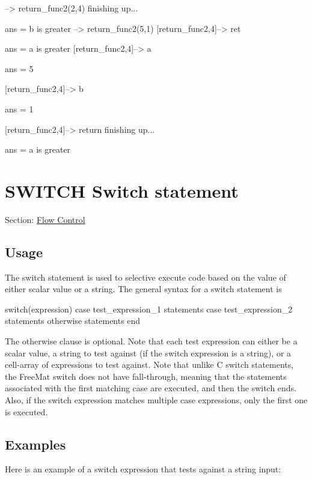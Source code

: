 \begin{DoxyVerbInclude}
--> return_func2(2,4)
finishing up...

ans = 
b is greater
--> return_func2(5,1)
[return_func2,4]--> ret

ans = 
a is greater
[return_func2,4]--> a

ans = 
 5 

[return_func2,4]--> b

ans = 
 1 

[return_func2,4]--> return
finishing up...

ans = 
a is greater
\end{DoxyVerbInclude}
 \hypertarget{flow_switch}{}\section{S\-W\-I\-T\-C\-H Switch statement}\label{flow_switch}
Section\-: \hyperlink{sec_flow}{Flow Control} \hypertarget{vtkwidgets_vtkxyplotwidget_Usage}{}\subsection{Usage}\label{vtkwidgets_vtkxyplotwidget_Usage}
The {\ttfamily switch} statement is used to selective execute code based on the value of either scalar value or a string. The general syntax for a {\ttfamily switch} statement is \begin{DoxyVerb}  switch(expression)
    case test_expression_1
      statements
    case test_expression_2
      statements
    otherwise
      statements
  end
\end{DoxyVerb}
 The {\ttfamily otherwise} clause is optional. Note that each test expression can either be a scalar value, a string to test against (if the switch expression is a string), or a {\ttfamily cell-\/array} of expressions to test against. Note that unlike {\ttfamily C} {\ttfamily switch} statements, the Free\-Mat {\ttfamily switch} does not have fall-\/through, meaning that the statements associated with the first matching case are executed, and then the {\ttfamily switch} ends. Also, if the {\ttfamily switch} expression matches multiple {\ttfamily case} expressions, only the first one is executed. \hypertarget{variables_matrix_Examples}{}\subsection{Examples}\label{variables_matrix_Examples}
Here is an example of a {\ttfamily switch} expression that tests against a string input\-:

